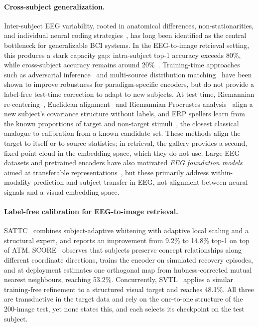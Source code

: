\documentclass[10pt,twocolumn,letterpaper]{article}
\begin{document}
\paragraph{Cross-subject generalization.}
Inter-subject EEG variability, rooted in anatomical differences, non-stationarities, and individual neural coding strategies~\cite{jayaram2016transfer,lotte2018review,samek2013transferring,onton2006imaging}, has long been identified as the central bottleneck for generalizable BCI systems.
In the EEG-to-image retrieval setting, this produces a stark capacity gap: intra-subject top-1 accuracy exceeds 80\%, while cross-subject accuracy remains around 20\%~\cite{du2025shallow,zhang2025neurobridge}.
Training-time approaches such as adversarial inference~\cite{ozdenizci2020adversarial} and multi-source distribution matching~\cite{chen2021msmda,she2023multisource} have been shown to improve robustness for paradigm-specific encoders, but do not provide a label-free test-time correction to adapt to new subjects. At test time, Riemannian re-centering~\cite{zanini2018transfer}, Euclidean alignment~\cite{he2020euclidean} and Riemannian Procrustes analysis~\cite{rodrigues2019rpa} align a new subject's covariance structure without labels, and ERP spellers learn from the known proportions of target and non-target stimuli~\cite{kindermans2012bayesian,huebner2017learning}, the closest classical analogue to calibration from a known candidate set. These methods align the target to itself or to source statistics; in retrieval, the gallery provides a second, fixed point cloud in the embedding space, which they do not use.
Large EEG datasets and pretrained encoders have also motivated \emph{EEG foundation models} aimed at transferable representations~\cite{elouahidi2025reve,cui2023neurogpt}, but these primarily address within-modality prediction and subject transfer in EEG, not alignment between neural signals and a visual embedding space.

\paragraph{Label-free calibration for EEG-to-image retrieval.}
SATTC~\cite{huang2026sattc} combines subject-adaptive whitening with adaptive local scaling and a structural expert, and reports an improvement from 9.2\% to 14.8\% top-1 on top of ATM. SCORE~\cite{cui2026score} observes that subjects preserve concept relationships along different coordinate directions, trains the encoder on simulated recovery episodes, and at deployment estimates one orthogonal map from hubness-corrected mutual nearest neighbours, reaching 53.2\%. Concurrently, SVTL~\cite{yadav2026svtl} applies a similar training-free refinement to a structured visual target and reaches 48.1\%. All three are transductive in the target data and rely on the one-to-one structure of the 200-image test, yet none states this, and each selects its checkpoint on the test subject.
\end{document}
